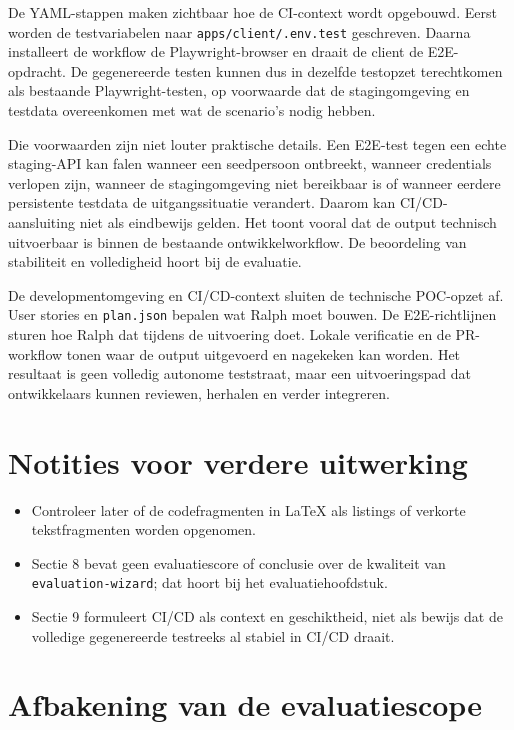 De YAML-stappen maken zichtbaar hoe de CI-context wordt opgebouwd. Eerst worden de testvariabelen naar \texttt{apps/client/.env.test} geschreven. Daarna installeert de workflow de Playwright-browser en draait de client de E2E-opdracht. De gegenereerde testen kunnen dus in dezelfde testopzet terechtkomen als bestaande Playwright-testen, op voorwaarde dat de stagingomgeving en testdata overeenkomen met wat de scenario's nodig hebben.

Die voorwaarden zijn niet louter praktische details. Een E2E-test tegen een echte staging-API kan falen wanneer een seedpersoon ontbreekt, wanneer credentials verlopen zijn, wanneer de stagingomgeving niet bereikbaar is of wanneer eerdere persistente testdata de uitgangssituatie verandert. Daarom kan CI/CD-aansluiting niet als eindbewijs gelden. Het toont vooral dat de output technisch uitvoerbaar is binnen de bestaande ontwikkelworkflow. De beoordeling van stabiliteit en volledigheid hoort bij de evaluatie.

De developmentomgeving en CI/CD-context sluiten de technische POC-opzet af. User stories en \texttt{plan.json} bepalen wat Ralph moet bouwen. De E2E-richtlijnen sturen hoe Ralph dat tijdens de uitvoering doet. Lokale verificatie en de PR-workflow tonen waar de output uitgevoerd en nagekeken kan worden. Het resultaat is geen volledig autonome teststraat, maar een uitvoeringspad dat ontwikkelaars kunnen reviewen, herhalen en verder integreren.

\section{Notities voor verdere uitwerking}

\begin{itemize}
    \item Controleer later of de codefragmenten in LaTeX als listings of verkorte tekstfragmenten worden opgenomen.
    \item Sectie 8 bevat geen evaluatiescore of conclusie over de kwaliteit van \texttt{evaluation-wizard}; dat hoort bij het evaluatiehoofdstuk.
    \item Sectie 9 formuleert CI/CD als context en geschiktheid, niet als bewijs dat de volledige gegenereerde testreeks al stabiel in CI/CD draait.
\end{itemize}

\section{Afbakening van de evaluatiescope}

